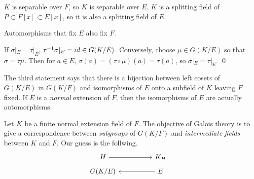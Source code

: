 \pf {} \(K\) is separable over \(F\), so \(K\) is separable over \(E\). \(K\) is a splitting field of \(P \subset F[x] \subset E[x]\), so it is also a splitting field of \(E\).

 Automorphisms that fix \(E\) also fix \(F\).

 If \(\sigma |_E = \tau |_E\), \(\tau^{-1}\sigma|_E = id \in G(K/E)\). Conversely, choose \(\mu \in G(K/E)\) so that \(\sigma = \tau\mu\). Then for \(a \in E\), \(\sigma(a) = (\tau\circ\mu)(a) = \tau(a)\), so \(\sigma |_E = \tau |_E\). \qed

The third statement says that there is a bijection between left cosets of \(G(K/E)\) in \(G(K/F)\) and isomorphisms of \(E\) onto a subfield of \(K\) leaving \(F\) fixed. If \(E\) is a \textit{normal} extension of \(F\), then the isomorphisms of \(E\) are actually automorphisms.

Let \(K\) be a finite normal extension field of \(F\). The objective of Galois theory is to give a correspondence between \textit{subgroups} of \(G(K/F)\) and \textit{intermediate fields} between \(K\) and \(F\). Our guess is the follwing.
\[
    \begin{tikzcd}[row sep=tiny]
        H \arrow{rr}&& K_H \\
        G(K/E) && E \arrow{ll}
    \end{tikzcd}
\]

